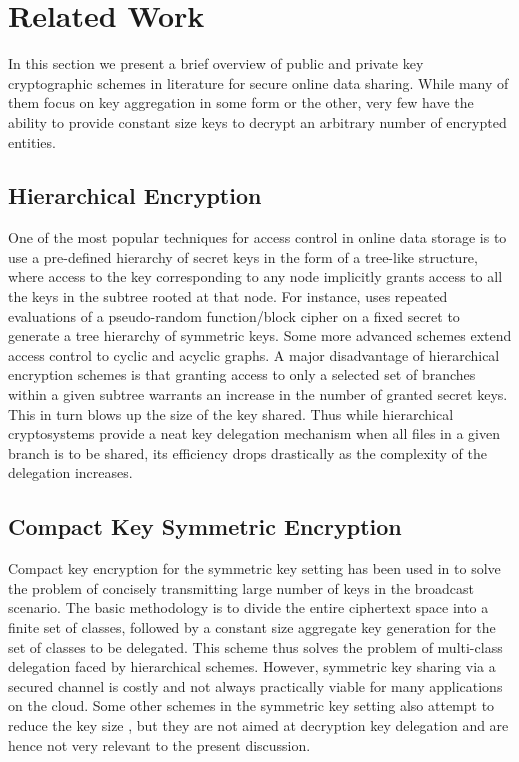 \section{Related Work}
\label{sec:relwork}

In this section we present a brief overview of public and private key cryptographic schemes in literature for secure online data sharing. While many of them focus on key aggregation in some form or the other, very few have the ability to provide constant size keys to decrypt an arbitrary number of encrypted entities.

\subsection{Hierarchical Encryption}
\label{subsec:hierarchy}

One of the most popular techniques for access control in online data storage is to use a pre-defined hierarchy of secret keys \cite{akl1983cryptographic,chick1990flexible,tzeng2002time,ateniese2012provably} in the form of a tree-like structure, where access to the key corresponding to any node implicitly grants access to all the keys in the subtree rooted at that node. For instance, \cite{sandhu1988cryptographic} uses repeated evaluations of a pseudo-random function/block cipher on a fixed secret to generate a tree hierarchy of symmetric keys. Some more advanced schemes \cite{sun2004scalable,king2015centralized,atallah2009dynamic} extend access control to cyclic and acyclic graphs. A major disadvantage of hierarchical encryption schemes is that granting access to only a selected set of branches within a given subtree warrants an increase in the number of granted secret keys. This in turn blows up the size of the key shared. Thus while hierarchical cryptosystems provide a neat key delegation mechanism when 
all files in a given branch is to be shared, its efficiency drops drastically as the complexity of the delegation increases.

\subsection{Compact Key Symmetric Encryption}
\label{subsec:symmetric}

Compact key encryption for the symmetric key setting has been used in \cite{benaloh2009patient,benaloh2009key} to solve the problem of concisely transmitting  large number of keys in the broadcast scenario. The basic methodology is to divide the entire ciphertext space into a finite set of classes, followed by a constant size aggregate key generation for the set of classes to be delegated. This scheme thus solves the problem of multi-class delegation faced by hierarchical schemes. However, symmetric key sharing via a secured channel is costly and not always practically viable for many applications on the cloud. Some other schemes in the symmetric key setting also attempt to reduce the key size \cite{alomair2009information}, but they are not aimed at decryption key delegation and are hence not very relevant to the present discussion.

